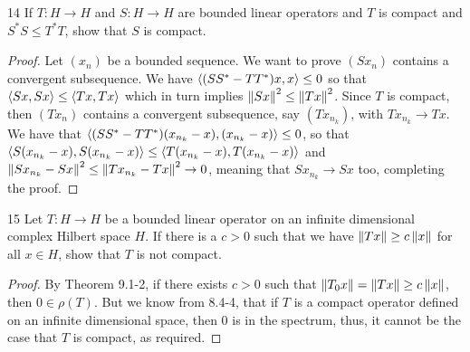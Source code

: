 \begin{exercise}{14}
If $T: H \to H$ and $S: H \to H$ are bounded linear operators and $T$ is compact and $S^\ast S \leq T^\ast T$, show that $S$ is compact.
\end{exercise}
\begin{proof}
Let $(x_n)$ be a bounded sequence.
We want to prove $(Sx_n)$ contains a convergent subsequence.
We have $\langle (SS^\ast - TT^\ast) x, x\rangle \leq 0$ so that $\langle Sx, Sx\rangle \leq \langle Tx, Tx\rangle$ which in turn implies $\left\lVert Sx\right\rVert^2 \leq \left\lVert Tx\right\rVert^2$.
Since $T$ is compact, then $(Tx_n)$ contains a convergent subsequence, say $(Tx_{n_k})$, with $Tx_{n_k} \to Tx$.
We have that $\langle (SS^\ast - TT^\ast) (x_{n_k} - x), (x_{n_k} - x)\rangle \leq 0$, so that $\langle S (x_{n_k} - x), S(x_{n_k} - x)\rangle \leq \langle T (x_{n_k} - x), T(x_{n_k} - x)\rangle$ and $\left\lVert Sx_{n_k} - Sx\right\rVert^2 \leq \left\lVert Tx_{n_k} - Tx\right\rVert^2 \to 0$, meaning that $S x_{n_k} \to Sx$ too, completing the proof.
\end{proof} 

\begin{exercise}{15}
Let $T: H \to H$ be a bounded linear operator on an infinite dimensional complex Hilbert space $H$.
If there is a $c > 0$ such that we have $\left\lVert Tx\right\rVert \geq c \left\lVert x\right\rVert$ for all $x \in H$, show that $T$ is not compact.
\end{exercise}
\begin{proof}
By Theorem 9.1-2, if there exists $c > 0$ such that $\left\lVert T_0 x\right\rVert = \left\lVert Tx\right\rVert \geq c \left\lVert x\right\rVert$, then $0 \in \rho(T)$.
But we know from 8.4-4, that if $T$ is a compact operator defined on an infinite dimensional space, then 0 is in the spectrum, thus, it cannot be the case that $T$ is compact, as required.
\end{proof} 
